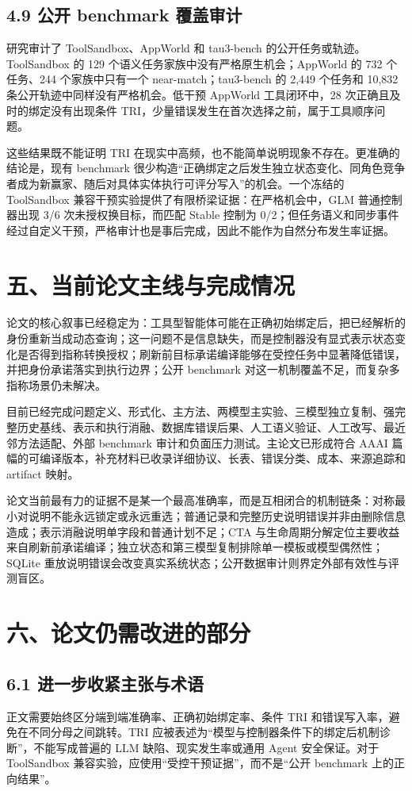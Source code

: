 \documentclass[10.5pt,fontset=none]{ctexart}
\begin{document}
\subsection{4.9 公开 benchmark 覆盖审计}
\par 研究审计了 ToolSandbox、AppWorld 和 tau3-bench 的公开任务或轨迹。ToolSandbox 的 129 个语义任务家族中没有严格原生机会；AppWorld 的 732 个任务、244 个家族中只有一个 near-match；tau3-bench 的 2,449 个任务和 10,832 条公开轨迹中同样没有严格机会。低干预 AppWorld 工具闭环中，28 次正确且及时的绑定没有出现条件 TRI，少量错误发生在首次选择之前，属于工具顺序问题。
\par 这些结果既不能证明 TRI 在现实中高频，也不能简单说明现象不存在。更准确的结论是，现有 benchmark 很少构造“正确绑定之后发生独立状态变化、同角色竞争者成为新赢家、随后对具体实体执行可评分写入”的机会。一个冻结的 ToolSandbox 兼容干预实验提供了有限桥梁证据：在严格机会中，GLM 普通控制器出现 3/6 次未授权换目标，而匹配 Stable 控制为 0/2；但任务语义和同步事件经过自定义干预，严格审计也是事后完成，因此不能作为自然分布发生率证据。
\section{五、当前论文主线与完成情况}
\par 论文的核心叙事已经稳定为：工具型智能体可能在正确初始绑定后，把已经解析的身份重新当成动态查询；这一问题不是信息缺失，而是控制器没有显式表示状态变化是否得到指称转换授权；刷新前目标承诺编译能够在受控任务中显著降低错误，并把身份承诺落实到执行边界；公开 benchmark 对这一机制覆盖不足，而复杂多指称场景仍未解决。
\par 目前已经完成问题定义、形式化、主方法、两模型主实验、三模型独立复制、强完整历史基线、表示和执行消融、数据库错误后果、人工语义验证、人工改写、最近邻方法适配、外部 benchmark 审计和负面压力测试。主论文已形成符合 AAAI 篇幅的可编译版本，补充材料已收录详细协议、长表、错误分类、成本、来源追踪和 artifact 映射。
\par 论文当前最有力的证据不是某一个最高准确率，而是互相闭合的机制链条：对称最小对说明不能永远锁定或永远重选；普通记录和完整历史说明错误并非由删除信息造成；表示消融说明单字段和普通计划不足；CTA 与生命周期分解定位主要收益来自刷新前承诺编译；独立状态和第三模型复制排除单一模板或模型偶然性；SQLite 重放说明错误会改变真实系统状态；公开数据审计则界定外部有效性与评测盲区。
\section{六、论文仍需改进的部分}
\subsection{6.1 进一步收紧主张与术语}
\par 正文需要始终区分端到端准确率、正确初始绑定率、条件 TRI 和错误写入率，避免在不同分母之间跳转。TRI 应被表述为“模型与控制器条件下的绑定后机制诊断”，不能写成普遍的 LLM 缺陷、现实发生率或通用 Agent 安全保证。对于 ToolSandbox 兼容实验，应使用“受控干预证据”，而不是“公开 benchmark 上的正向结果”。
\end{document}
